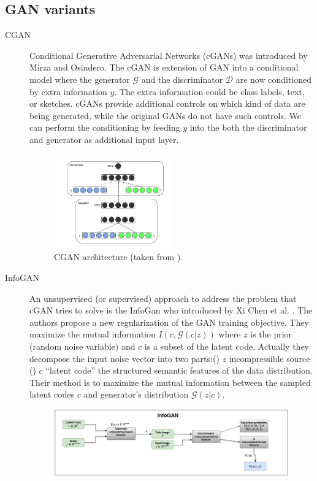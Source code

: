 \documentclass[letterpaper,12pt]{article}
\newcommand{\lowerromannumeral}[1]{\romannumeral#1\relax}
\begin{document}
\subsection{GAN variants}
\begin{description}
\item[CGAN]  Conditional Generative Adversarial Networks (cGANs) was introduced by Mirza and Osindero\cite{DBLP:journals/corr/MirzaO14}. The cGAN is extension of GAN into a conditional model where the generator \(\mathcal{G}\) and the discriminator \(\mathcal{D}\) are now conditioned by extra information \(y\). The extra information could be class labels, text, or sketches. cGANs provide additional controls on
which kind of data are being generated, while the original GANs do not have such controls. We can perform the conditioning by feeding \(y\) into the both the discriminator and generator as additional input layer.
\begin{figure}[H]
\centering
\includegraphics[width=0.5\textwidth]{CGAN.png}
\caption{\label{figure 2 }CGAN architecture (taken from \cite{DBLP:journals/corr/MirzaO14}).}
\end{figure}
\newpage
\item [InfoGAN] An  unsupervised (or supervised)  approach to address the problem that cGAN tries to solve is the InfoGan who introduced by Xi Chen et al. \cite{NIPS2016_6399}. The authors propose a new regularization of the GAN training objective. They maximize the mutual information \(I(c,\mathcal{G}(c|z))\)  where \(z\) is the prior (random noise variable) and \(c\) is a subset of the latent code. Actually they decompose the input noise vector into two parts:(\lowerromannumeral{1}) \( z\) incompressible source (\lowerromannumeral{2}) \(c\) “latent code” the structured semantic features of the data distribution. Their method is to maximize the mutual information between the sampled latent codes \(c\) and generator's distribution \(\mathcal{G}(z|c)\).
\begin{figure}[H]
\centering
\includegraphics[scale=0.4]{infoGan}

\end{figure}
\end{description}
\end{document}

